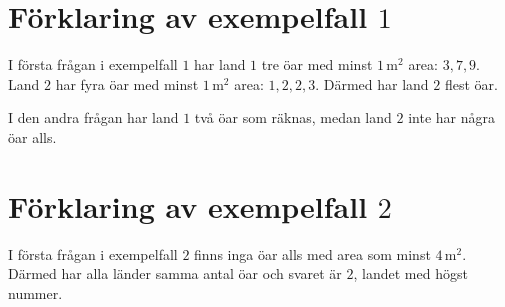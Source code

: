 \section*{Förklaring av exempelfall $1$}
I första frågan i exempelfall $1$ har land $1$ tre öar med minst $1\,\text{m}^2$ area: $3, 7, 9$.
Land $2$ har fyra öar med minst $1\,\text{m}^2$ area: $1, 2, 2, 3$.
Därmed har land $2$ flest öar.

I den andra frågan har land $1$ två öar som räknas, medan land $2$ inte har några öar alls.

\section*{Förklaring av exempelfall $2$}
I första frågan i exempelfall $2$ finns inga öar alls med area som minst $4\,\text{m}^2$.
Därmed har alla länder samma antal öar och svaret är $2$, landet med högst nummer.
